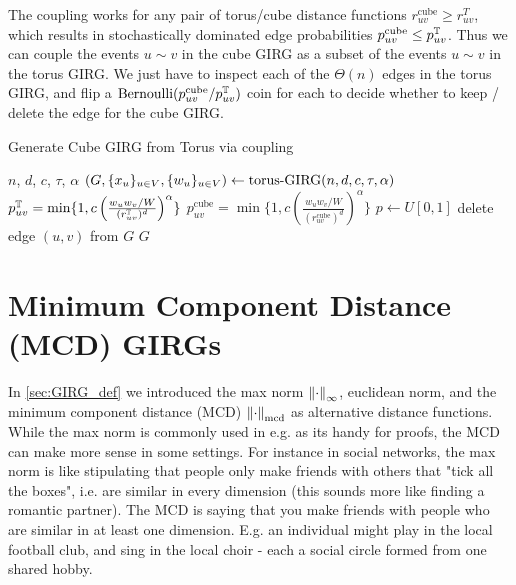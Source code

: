 The coupling works for any pair of torus/cube distance functions $r_{uv}^\text{cube} \geq r_{uv}^T$, which results in stochastically dominated edge probabilities $p_{uv}^\text{cube} \leq p_{uv}^{\mathbb{T}}$. Thus we can couple the events $u \sim v$ in the cube GIRG as a subset of the events $u \sim v$ in the torus GIRG. We just have to inspect each of the $\Theta(n)$ edges in the torus GIRG, and flip a $\operatorname{Bernoulli}(p_{uv}^\text{cube} / p_{uv}^{\mathbb{T}})$ coin for each to decide whether to keep / delete the edge for the cube GIRG.

\begin{algorithm}
    \caption{Generate Cube GIRG from Torus via coupling}\label{alg:cube_coupling}
    \begin{algorithmic}
    \Require $n$, $d$, $c$, $\tau$, $\alpha$
    \State $\left ( G, \{x_u\}_{u \in V}, \{w_u\}_{u \in V} \right ) \gets \text{torus-}\mathrm{GIRG}(n,d,c,\tau, \alpha)$
        \State $p_{uv}^{\mathbb{T}} = \min \{1, c \left (
            \frac{w_u w_v / W}{(r_{uv}^{\mathbb{T}})^d} \right )^\alpha \}$
        \State $p_{uv}^\text{cube} = \min \{1, c \left (
            \frac{w_u w_v / W}{(r_{uv}^\text{cube})^d} \right )^\alpha \}$
        \State $p \gets U[0,1]$
            \State delete edge $(u,v)$ from $G$
        \EndIf
    \EndFor
    \State \Return $G$
\end{algorithmic}
\end{algorithm}




\section{Minimum Component Distance (MCD) GIRGs}
In \cref{sec:GIRG_def} we introduced the max norm $\left\lVert \cdot\right\rVert_\infty$, euclidean norm, and the minimum component distance (MCD) $\left\lVert \cdot\right\rVert_{\mathrm{mcd}}$ as alternative distance functions.
While the max norm is commonly used in e.g. \cite{bringmann2019geometric} as its handy for proofs, the MCD can make more sense in some settings. For instance in social networks, the max norm is like stipulating that people only make friends with others that "tick all the boxes", i.e. are similar in every dimension (this sounds more like finding a romantic partner). The MCD is saying that you make friends with people who are similar in at least one dimension. E.g. an individual might play in the local football club, and sing in the local choir - each a social circle formed from one shared hobby.

